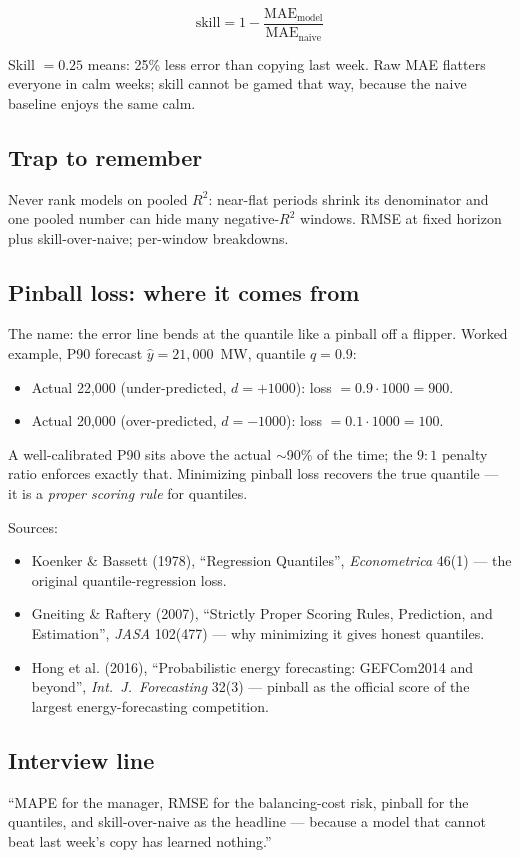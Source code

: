 \begin{equation}
  \mathrm{skill} = 1 - \frac{\mathrm{MAE}_{\mathrm{model}}}{\mathrm{MAE}_{\mathrm{naive}}}
\end{equation}

Skill $= 0.25$ means: 25\% less error than copying last week.
Raw MAE flatters everyone in calm weeks; skill cannot be gamed that way,
because the naive baseline enjoys the same calm.

\subsection{Trap to remember}

Never rank models on pooled $R^2$: near-flat periods shrink its denominator
and one pooled number can hide many negative-$R^2$ windows.
RMSE at fixed horizon plus skill-over-naive; per-window breakdowns.

\subsection{Pinball loss: where it comes from}

The name: the error line bends at the quantile like a pinball off a flipper.
Worked example, P90 forecast $\hat{y} = 21{,}000$~MW, quantile $q = 0.9$:

\begin{itemize}
  \item Actual 22,000 (under-predicted, $d = +1000$): loss $= 0.9 \cdot 1000 = 900$.
  \item Actual 20,000 (over-predicted, $d = -1000$): loss $= 0.1 \cdot 1000 = 100$.
\end{itemize}

A well-calibrated P90 sits above the actual $\sim$90\% of the time; the
$9{:}1$ penalty ratio enforces exactly that. Minimizing pinball loss recovers
the true quantile --- it is a \emph{proper scoring rule} for quantiles.

Sources:
\begin{itemize}
  \item Koenker \& Bassett (1978), ``Regression Quantiles'', \emph{Econometrica}
        46(1) --- the original quantile-regression loss.
  \item Gneiting \& Raftery (2007), ``Strictly Proper Scoring Rules, Prediction,
        and Estimation'', \emph{JASA} 102(477) --- why minimizing it gives
        honest quantiles.
  \item Hong et al. (2016), ``Probabilistic energy forecasting: GEFCom2014 and
        beyond'', \emph{Int.\ J.\ Forecasting} 32(3) --- pinball as the official
        score of the largest energy-forecasting competition.
\end{itemize}

\subsection{Interview line}

``MAPE for the manager, RMSE for the balancing-cost risk, pinball for the
quantiles, and skill-over-naive as the headline --- because a model that
cannot beat last week's copy has learned nothing.''
